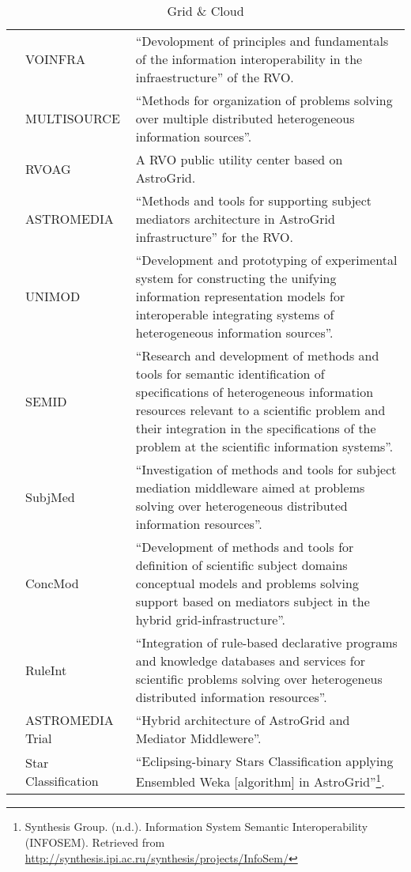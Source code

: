 \begin{table*}[h!t]
\begin{tabular}{|l|p{3cm}|p{12.5cm}|}
			& VOINFRA & ``Devolopment of principles and fundamentals of the information interoperability in the infraestructure'' of the RVO. \\
			& MULTISOURCE & ``Methods for organization of problems solving over multiple distributed heterogeneous information sources''.\\
			& RVOAG & A RVO public utility center based on AstroGrid. \\
			& ASTROMEDIA & ``Methods and tools for supporting subject mediators architecture in AstroGrid infrastructure'' for the RVO.\\
			& UNIMOD & ``Development and prototyping of experimental system for constructing the unifying information representation models for 
								interoperable integrating systems of heterogeneous information sources''.\\
			& SEMID & ``Research and development of methods and tools for semantic identification of specifications of heterogeneous information resources 
								relevant to a scientific problem and their integration in the specifications of the problem at the scientific information 
								systems''.\\
			& SubjMed & ``Investigation of methods and tools for subject mediation middleware aimed at problems solving over heterogeneous distributed 
								information resources''.\\
			& ConcMod & ``Development of methods and tools for definition of scientific subject domains conceptual models and problems solving support based 
								on mediators subject in the hybrid grid-infrastructure''.\\
			& RuleInt & ``Integration of rule-based declarative programs and knowledge databases and services for scientific problems solving over 
								heterogeneus distributed information resources''. \\
			& ASTROMEDIA Trial & ``Hybrid architecture of AstroGrid and Mediator Middlewere''. \\
			& Star Classification & ``Eclipsing-binary Stars Classification applying Ensembled Weka [algorithm] in AstroGrid''\footnote{Synthesis Group. 
								(n.d.). Information System Semantic Interoperability (INFOSEM). Retrieved from 
								\url{http://synthesis.ipi.ac.ru/synthesis/projects/InfoSem/}}.\\
	\hline
	\end{tabular}
	\caption{Grid \& Cloud}
	\label{table:gc}
\end{table*}


